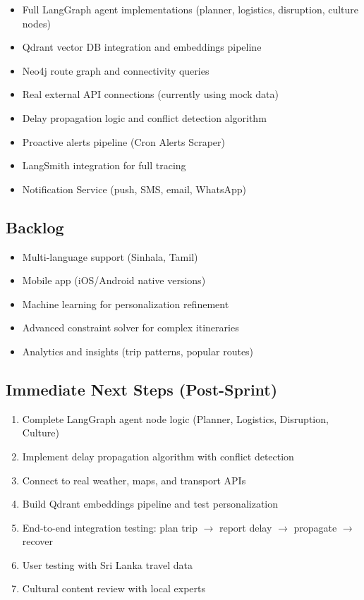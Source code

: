 \documentclass[11pt]{article}
\begin{document}
\begin{itemize}
    \item Full LangGraph agent implementations (planner, logistics, disruption, culture nodes)
    \item Qdrant vector DB integration and embeddings pipeline
    \item Neo4j route graph and connectivity queries
    \item Real external API connections (currently using mock data)
    \item Delay propagation logic and conflict detection algorithm
    \item Proactive alerts pipeline (Cron \textrightarrow{} Alerts Scraper)
    \item LangSmith integration for full tracing
    \item Notification Service (push, SMS, email, WhatsApp)
\end{itemize}

\subsection{Backlog}

\begin{itemize}
    \item Multi-language support (Sinhala, Tamil)
    \item Mobile app (iOS/Android native versions)
    \item Machine learning for personalization refinement
    \item Advanced constraint solver for complex itineraries
    \item Analytics and insights (trip patterns, popular routes)
\end{itemize}

\subsection{Immediate Next Steps (Post-Sprint)}

\begin{enumerate}
    \item Complete LangGraph agent node logic (Planner, Logistics, Disruption, Culture)
    \item Implement delay propagation algorithm with conflict detection
    \item Connect to real weather, maps, and transport APIs
    \item Build Qdrant embeddings pipeline and test personalization
    \item End-to-end integration testing: plan trip $\rightarrow$ report delay $\rightarrow$ propagate $\rightarrow$ recover
    \item User testing with Sri Lanka travel data
    \item Cultural content review with local experts
\end{enumerate}
\end{document}
